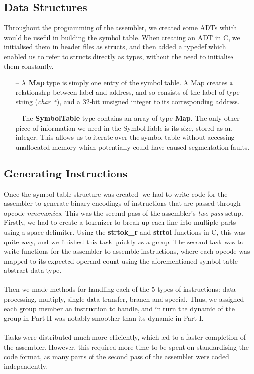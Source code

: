 \documentclass[11pt]{article}
\begin{document}
\subsection{Data Structures}

Throughout the programming of the assembler, we created some ADTs which would be useful in building the symbol table. When creating an ADT in C, we initialised them in header files as structs, and then added a typedef which enabled us to refer to structs directly as types, without the need to initialise them constantly.

\begin{itemize}
  \item[--] A \textbf{Map} type is simply one entry of the symbol table. A Map creates a relationship between label and address, and so consists of the label of type string (\emph{char *}), and a 32-bit unsigned integer to its corresponding address.

  \item[--] The \textbf{SymbolTable} type contains an array of type \textbf{Map}. The only other piece of information we need in the SymbolTable is its size, stored as an integer. This allows us to iterate over the symbol table without accessing unallocated memory which potentially could have caused segmentation faults.

\end{itemize}

\subsection{Generating Instructions}

Once the symbol table structure was created, we had to write code for the assembler to generate binary encodings of instructions that are passed through opcode \emph{mnemonics}. This was the second pass of the assembler's \emph{two-pass} setup. Firstly, we had to create a tokenizer to break up each line into multiple parts using a space delimiter. Using the \textbf{strtok\_r} and \textbf{strtol} functions in C, this was quite easy, and we finished this task quickly as a group. The second task was to write functions for the assembler to assemble instructions, where each opcode was mapped to its expected operand count using the aforementioned symbol table abstract data type. \\\\ Then we made methods for handling each of the 5 types of instructions: data processing, multiply, single data transfer, branch and special. Thus, we assigned each group member an instruction to handle, and in turn the dynamic of the group in Part II was notably smoother than its dynamic in Part I. \\\\ Tasks were distributed much more efficiently, which led to a faster completion of the assembler. However, this required more time to be spent on standardising the code format, as many parts of the second pass of the assembler were coded independently.
\end{document}
